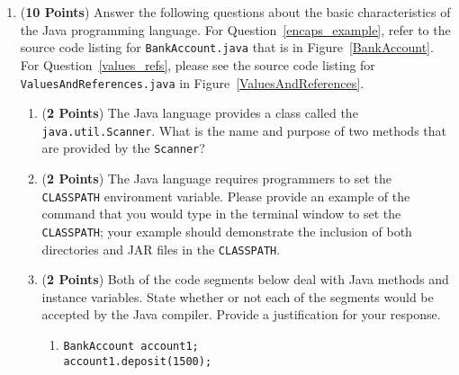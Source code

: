 \documentclass[12pt]{article}
\begin{document}
\begin{enumerate}

\item ({\bf 10 Points}) Answer the following questions about the basic characteristics of the Java programming language.
  For Question~\ref{encaps_example}, refer to the source code listing for {\tt BankAccount.java} that is in
  Figure~\ref{BankAccount}. For Question~\ref{values_refs}, please see the source code listing for {\tt
  ValuesAndReferences.java} in Figure~\ref{ValuesAndReferences}.

\begin{enumerate}


\item ({\bf 2 Points}) The Java language provides a class called the {\tt java.util.Scanner}.  What is the name and
  purpose of two methods that are provided by the {\tt Scanner}?


\item ({\bf 2 Points}) The Java language requires programmers to set the {\tt CLASSPATH} environment variable.  Please
  provide an example of the command that you would type in the terminal window to set the {\tt CLASSPATH}; your example
  should demonstrate the inclusion of both directories and JAR files in the {\tt CLASSPATH}.


\item \label{encaps_example} ({\bf 2 Points}) Both of the code
segments below deal with Java methods and instance variables. State
whether or not each of the segments would be accepted by the Java
compiler.  Provide a justification for your response.

\begin{enumerate}

\item {\tt BankAccount account1;}\\
  {\tt account1.deposit(1500);}


\end{enumerate}
\end{enumerate}
\end{enumerate}
\end{document}
